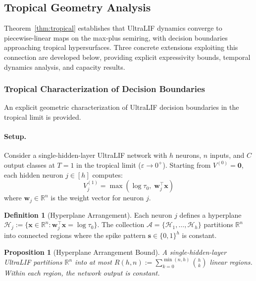 \documentclass{article}
\theoremstyle{plain}
\newtheorem{proposition}[theorem]{Proposition}
\theoremstyle{definition}
\newtheorem{definition}[theorem]{Definition}
\theoremstyle{remark}
\newcommand{\eps}{\varepsilon}
\begin{document}
\subsection{Tropical Geometry Analysis}
\label{app:tropical-analysis}

Theorem~\ref{thm:tropical} establishes that UltraLIF dynamics converge to piecewise-linear maps on the max-plus semiring, with decision boundaries approaching tropical hypersurfaces. Three concrete extensions exploiting this connection are developed below, providing explicit expressivity bounds, temporal dynamics analysis, and capacity results.

\subsubsection{Tropical Characterization of Decision Boundaries}
\label{app:tropical-boundaries}

An explicit geometric characterization of UltraLIF decision boundaries in the tropical limit is provided.

\paragraph{Setup.} Consider a single-hidden-layer UltraLIF network with $h$ neurons, $n$ inputs, and $C$ output classes at $T{=}1$ in the tropical limit ($\eps \to 0^+$). Starting from $V^{(0)} = \mathbf{0}$, each hidden neuron $j \in [h]$ computes:
\begin{equation}
\label{eq:app-tropical-neuron}
V_j^{(1)} = \max(\log \tau_0, \; \mathbf{w}_j^\top \mathbf{x})
\end{equation}
where $\mathbf{w}_j \in \mathbb{R}^n$ is the weight vector for neuron $j$.

\begin{definition}[Hyperplane Arrangement]
Each neuron $j$ defines a hyperplane $\mathcal{H}_j := \{\mathbf{x} \in \mathbb{R}^n : \mathbf{w}_j^\top \mathbf{x} = \log \tau_0\}$. The collection $\mathcal{A} = \{\mathcal{H}_1, \ldots, \mathcal{H}_h\}$ partitions $\mathbb{R}^n$ into connected regions where the spike pattern $\mathbf{s} \in \{0,1\}^h$ is constant.
\end{definition}

\begin{proposition}[Hyperplane Arrangement Bound]
\label{prop:app-tropical-arrangement}
A single-hidden-layer UltraLIF partitions $\mathbb{R}^n$ into at most $R(h, n) := \sum_{k=0}^{\min(n,h)} \binom{h}{k}$ linear regions. Within each region, the network output is constant.
\end{proposition}
\end{document}
